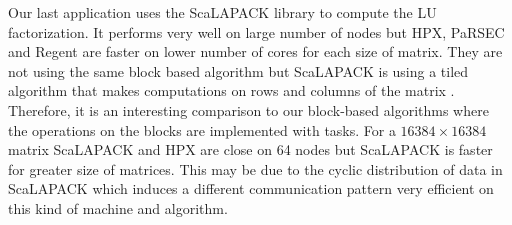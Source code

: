 Our last application uses the ScaLAPACK library to compute the LU factorization.
It performs very well on large number of nodes but HPX, PaRSEC and Regent are faster on lower number of cores for each size of matrix.
They are not using the same block based algorithm but ScaLAPACK is using a tiled algorithm that makes computations on rows and columns of the matrix \cite{ChDPW1992}.
Therefore, it is an interesting comparison to our block-based algorithms where the operations on the blocks are implemented with tasks.
For a $16384 \times 16384$ matrix ScaLAPACK and HPX are close on 64 nodes but ScaLAPACK is faster for greater size of matrices.
This may be due to the cyclic distribution of data in ScaLAPACK which induces a different communication pattern very efficient on this kind of machine and algorithm.

